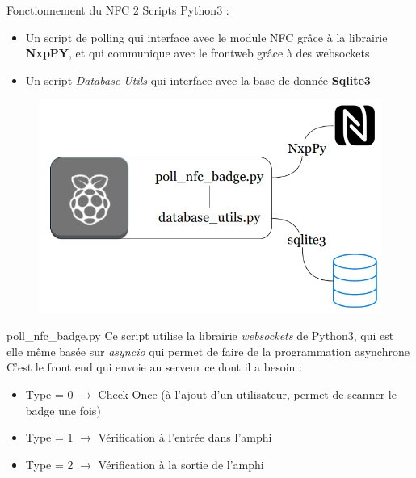 \documentclass[aspectratio=169]{beamer}
\begin{document}
\begin{frame}{Fonctionnement du NFC}
  2 Scripts Python3 :
  \begin{itemize}
    \item Un script de polling qui interface avec le module NFC grâce à la librairie \textbf{NxpPY}, et qui communique avec le frontweb grâce à des websockets
    \item Un script \textit{Database Utils} qui interface avec la base de donnée \textbf{Sqlite3}
  \end{itemize}
  \begin{figure}
    \centering
    \includegraphics[width=.5\textwidth]{../assets/nfcarchitecture.png}
  \end{figure}
\end{frame}

\begin{frame}{poll\_nfc\_badge.py}
  Ce script utilise la librairie \textit{websockets} de Python3, qui est elle même basée sur \textit{asyncio} qui permet de faire de la programmation asynchrone
  C'est le front end qui envoie au serveur ce dont il a besoin :
  \begin{itemize}
    \item Type = 0 $\rightarrow$ Check Once (à l'ajout d'un utilisateur, permet de scanner le badge une fois)
    \item Type = 1 $\rightarrow$ Vérification à l'entrée dans l'amphi
    \item Type = 2 $\rightarrow$ Vérification à la sortie de l'amphi
  \end{itemize}

\end{frame}
\end{document}
